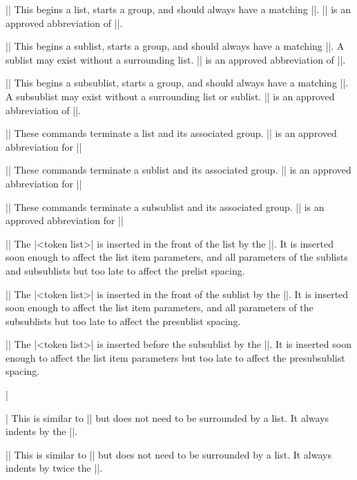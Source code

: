 \beginblockmode
\ext\@|\beginlist \bl|
\nbr
This begins a list, starts a group, 
and should always have a matching |\endlist|. 
|\bl| is an approved abbreviation of |\beginlist|.


\mbr\ext\@|\beginsublist \bsl|
\nbr
This begins a sublist, starts a group, 
and should always have a matching |\endsublist|.
A sublist may exist without a surrounding list. 
|\bsl| is an approved abbreviation of |\beginsublist|.
 

\mbr\ext\@|\beginsubsublist \bssl|
\nbr
This begins a subsublist, starts a group, 
and should always have a matching |\endsubsublist|.
A subsublist may exist without a surrounding list or sublist.
|\bssl| is an approved abbreviation of |\beginsubsublist|.


\mbr\ext\@|\endlist \el|
\nbr
These commands terminate a list and its associated group.
|\el| is an approved abbreviation for |\endlist| 

\mbr\ext\@|\endsublist \esl|
\nbr
These commands terminate a sublist and its associated group.
|\esl| is an approved abbreviation for |\endsublist| 

\mbr\ext\@|\endsubsublist \essl|
\nbr
These commands terminate a subsublist and its associated group.
|\essl| is an approved abbreviation for |\endsubsublist| 


\mbr
\ext\@||
\nbr
The |<token list>| is inserted in the front of the list by the |\beginlist|.
It is inserted soon enough to affect the list item parameters, and all
parameters of the sublists and subsublists but too late to affect the prelist
spacing. 

\mbr
\ext\@||
\nbr
The |<token list>| is inserted in the front of the sublist by the 
|\beginsublist|.
It is inserted soon enough to affect the list item parameters, and all
parameters of the subsublists but too late to affect the presublist
spacing. 

\mbr
\ext\@||
\nbr
The |<token list>| is inserted before the subsublist by the 
|\beginsubsublist|.
It is inserted soon enough to affect the list item parameters 
but too late to affect the presubsublist
spacing. 


\mbr\pla\@|\item|
\nbr
This is similar to |\listitem| but does not need to be surrounded by a list.
It always indents by the |\parindent|.

\mbr\pla\@|\itemitem|
\nbr
This is similar to |\listitem| but does not need to be surrounded by a list.
It always indents by twice the |\parindent|.


